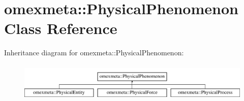 \hypertarget{classomexmeta_1_1PhysicalPhenomenon}{}\section{omexmeta\+:\+:Physical\+Phenomenon Class Reference}
\label{classomexmeta_1_1PhysicalPhenomenon}
Inheritance diagram for omexmeta\+:\+:Physical\+Phenomenon\+:\begin{figure}[H]
\begin{center}
\leavevmode
\includegraphics[height=1.848185cm]{classomexmeta_1_1PhysicalPhenomenon}
\end{center}
\end{figure}
